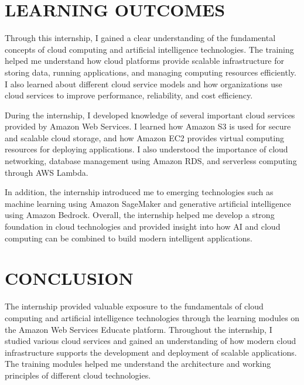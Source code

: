 \documentclass[12pt, a4paper, oneside]{report}
\begin{document}
\chapter{LEARNING OUTCOMES}

Through this internship, I gained a clear understanding of the fundamental concepts of 
cloud computing and artificial intelligence technologies. The training helped me 
understand how cloud platforms provide scalable infrastructure for storing data, running 
applications, and managing computing resources efficiently. I also learned about 
different cloud service models and how organizations use cloud services to improve 
performance, reliability, and cost efficiency.

During the internship, I developed knowledge of several important cloud services 
provided by Amazon Web Services. I learned how Amazon S3 is used for secure and 
scalable cloud storage, and how Amazon EC2 provides virtual computing resources for 
deploying applications. I also understood the importance of cloud networking, database 
management using Amazon RDS, and serverless computing through AWS Lambda.

In addition, the internship introduced me to emerging technologies such as machine 
learning using Amazon SageMaker and generative artificial intelligence using Amazon 
Bedrock. Overall, the internship helped me develop a strong foundation in cloud 
technologies and provided insight into how AI and cloud computing can be combined 
to build modern intelligent applications.


\chapter{CONCLUSION}

The internship provided valuable exposure to the fundamentals of cloud computing and 
artificial intelligence technologies through the learning modules on the Amazon Web 
Services Educate platform. Throughout the internship, I studied various cloud services 
and gained an understanding of how modern cloud infrastructure supports the 
development and deployment of scalable applications. The training modules helped me 
understand the architecture and working principles of different cloud technologies.
\end{document}
